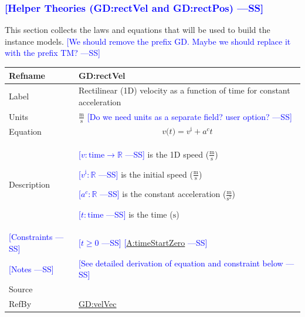 \documentclass[12pt]{article}
\newcommand{\authornote}[3]{\textcolor{#1}{[#3 ---#2]}}
\newcommand{\authornote}[3]{}
\newcommand{\wss}[1]{\authornote{blue}{SS}{#1}}
\begin{document}
\subsubsection{\wss{Helper Theories (GD:rectVel and GD:rectPos)}}
\label{Sec:GDs}
This section collects the laws and equations that will be used to build the instance models.
\wss{We should remove the prefix GD.  Maybe we should replace it with the prefix
TM?}
\medskip
\noindent
\begin{minipage}{\textwidth}
\begin{tabular}{>{\raggedright}p{}>{\raggedright\arraybackslash}p{}}
\toprule \textbf{Refname} & \textbf{GD:rectVel}
\label{GD:rectVel}
\\ \midrule
Label & Rectilinear (1D) velocity as a function of time for constant acceleration
        
\\ \midrule
Units & $\frac{\text{m}}{\text{s}}$ \wss{Do we need units as a separate field? user option?}
\\ \midrule
Equation & \begin{displaymath}
           v\text{(}t\text{)}={v^{\text{i}}}+{a^{c}} t
           \end{displaymath}
\\ \midrule
Description & \begin{symbDescription}
              \item{\wss{$v: \text{time} \rightarrow \mathbb{R}$} is the 1D speed ($\frac{\text{m}}{\text{s}}$)}
              \item{\wss{${v^{\text{i}}: \mathbb{R}}$} is the initial speed ($\frac{\text{m}}{\text{s}}$)}
              \item{\wss{${a^{c}: \mathbb{R}}$} is the constant acceleration ($\frac{\text{m}}{\text{s}^{2}}$)}
              \item{\wss{$t: \text{time}$} is the time (${\text{s}}$)}
              \end{symbDescription}

\\ \midrule
\wss{Constraints} & \wss{$t \geq 0$}
\wss{\hyperref[timeStartZero]{A:timeStartZero}} 

\\ \midrule
\wss{Notes} & \wss{See detailed derivation of equation and constraint below}

\\ \midrule
Source & \cite[(pg. 8)]{hibbeler2004}
         
\\ \midrule
RefBy & \hyperref[GD:velVec]{GD:velVec}%
        
\\ \bottomrule
\end{tabular}
\end{minipage}
\end{document}
